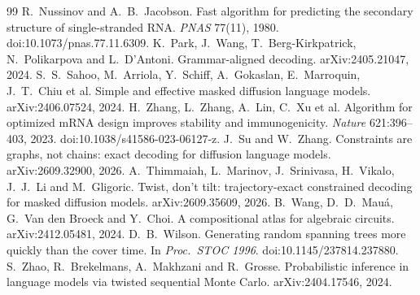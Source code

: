 \documentclass[11pt]{article}
\theoremstyle{definition}
\begin{document}
\begin{thebibliography}{99}
 R.~Nussinov and A.~B.~Jacobson. Fast algorithm for predicting the secondary structure of single-stranded RNA. \emph{PNAS} 77(11), 1980. doi:10.1073/pnas.77.11.6309.
 K.~Park, J.~Wang, T.~Berg-Kirkpatrick, N.~Polikarpova and L.~D'Antoni. Grammar-aligned decoding. arXiv:2405.21047, 2024.
 S.~S.~Sahoo, M.~Arriola, Y.~Schiff, A.~Gokaslan, E.~Marroquin, J.~T.~Chiu et al. Simple and effective masked diffusion language models. arXiv:2406.07524, 2024.
 H.~Zhang, L.~Zhang, A.~Lin, C.~Xu et al. Algorithm for optimized mRNA design improves stability and immunogenicity. \emph{Nature} 621:396--403, 2023. doi:10.1038/s41586-023-06127-z.
 J.~Su and W.~Zhang. Constraints are graphs, not chains: exact decoding for diffusion language models. arXiv:2609.32900, 2026.
 A.~Thimmaiah, L.~Marinov, J.~Srinivasa, H.~Vikalo, J.~J.~Li and M.~Gligoric. Twist, don't tilt: trajectory-exact constrained decoding for masked diffusion models. arXiv:2609.35609, 2026.
 B.~Wang, D.~D.~Mau\'a, G.~Van den Broeck and Y.~Choi. A compositional atlas for algebraic circuits. arXiv:2412.05481, 2024.
 D.~B.~Wilson. Generating random spanning trees more quickly than the cover time. In \emph{Proc.\ STOC 1996}. doi:10.1145/237814.237880.
 S.~Zhao, R.~Brekelmans, A.~Makhzani and R.~Grosse. Probabilistic inference in language models via twisted sequential Monte Carlo. arXiv:2404.17546, 2024.
\end{thebibliography}
\end{document}
